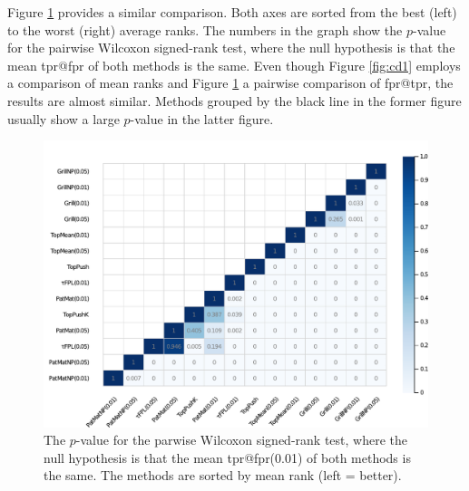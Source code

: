 Figure \ref{fig:wilcoxon} provides a similar comparison. Both axes are sorted from the best (left) to the worst (right) average ranks. The numbers in the graph show the $p$-value for the pairwise Wilcoxon signed-rank test, where the null hypothesis is that the mean tpr@fpr of both methods is the same. Even though Figure \ref{fig:cd1} employs a comparison of mean ranks and Figure \ref{fig:wilcoxon} a pairwise comparison of fpr@tpr, the results are almost similar. Methods grouped by the black line in the former figure usually show a large $p$-value in the latter figure.

\begin{figure}[!ht]
    \centering
    \includegraphics[width = \linewidth]{data/wilcoxon_fpr_1.pdf}
    \caption{The $p$-value for the parwise Wilcoxon signed-rank test, where the null hypothesis is that the mean tpr@fpr(0.01) of both methods is the same. The methods are sorted by mean rank (left = better).}
    \label{fig:wilcoxon}
\end{figure}

